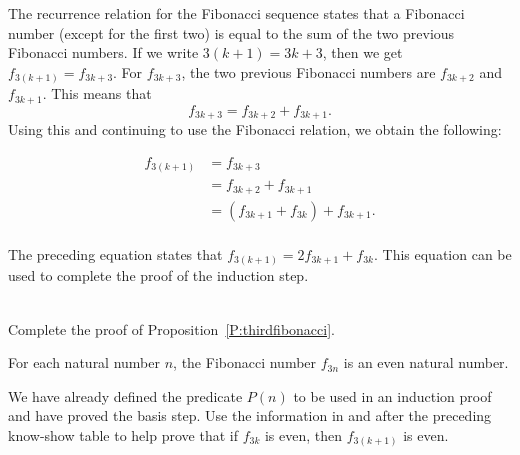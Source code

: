 The recurrence relation for the Fibonacci sequence states that a Fibonacci number (except for the first two) is equal to the sum of the two previous Fibonacci numbers.  If we write  $3\left( {k + 1} \right) = 3k + 3$, then we get  $f_{3\left( {k + 1} \right)}  = f_{3k + 3} $.  For  $f_{3k + 3} $, the two previous Fibonacci numbers are  $f_{3k + 2} $ and  $f_{3k + 1} $.  This means that
\[
f_{3k + 3}  = f_{3k + 2}  + f_{3k + 1}\!.
\]  
Using this and continuing to use the Fibonacci relation, we obtain the following:

\[
\begin{aligned}
f_{3\left( {k + 1} \right)}  &= f_{3k + 3}  \\ 
                             &= f_{3k + 2}  + f_{3k + 1}  \\ 
                             &= \left( {f_{3k + 1}  + f_{3k} } \right) + f_{3k + 1} . \\ 
\end{aligned} 
\]

The preceding equation states that  $f_{3\left( {k + 1} \right)}  = 2f_{3k + 1}  + f_{3k} $.  This equation can be used to complete the proof of the induction step.
\hbreak
%
\begin{prog} \label{prog:thirdfibonacci} \hfill \\
Complete the proof of Proposition~\ref{P:thirdfibonacci}.

\begin{proposition} \label{P:thirdfibonacci}
For each natural number $n$, the Fibonacci number $f_{3n}$ is an even natural number.
\end{proposition}

\noindent
\hint  We have already defined the predicate  $P\left( n \right)$ to be used in an induction proof and have proved the basis step.  
Use the information in and after the preceding know-show table to help prove that if  $f_{3k} $ is even, then  $f_{3\left( {k + 1} \right)} $  is even.
\end{prog}
\hbreak

\endinput
